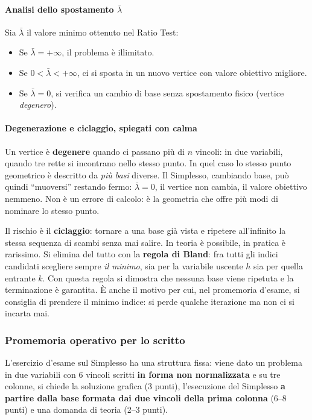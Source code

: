 \documentclass[12pt]{extarticle} %
\begin{document}
\paragraph{Analisi dello spostamento $\bar{\lambda}$}
Sia $\bar{\lambda}$ il valore minimo ottenuto nel Ratio Test:
\begin{itemize}
    \item Se $\bar{\lambda} = +\infty$, il problema è illimitato.
    \item Se $0 < \bar{\lambda} < +\infty$, ci si sposta in un nuovo vertice con valore obiettivo migliore.
    \item Se $\bar{\lambda} = 0$, si verifica un cambio di base senza spostamento fisico (vertice \textit{degenero}).
\end{itemize}

\paragraph{Degenerazione e ciclaggio, spiegati con calma}
Un vertice è \textbf{degenere} quando ci passano più di $n$ vincoli: in due variabili, quando tre rette si incontrano nello stesso punto. In quel caso lo stesso punto geometrico è descritto da \emph{più basi} diverse. Il Simplesso, cambiando base, può quindi ``muoversi'' restando fermo: $\bar{\lambda} = 0$, il vertice non cambia, il valore obiettivo nemmeno. Non è un errore di calcolo: è la geometria che offre più modi di nominare lo stesso punto.

\noindent Il rischio è il \textbf{ciclaggio}: tornare a una base già vista e ripetere all'infinito la stessa sequenza di scambi senza mai salire. In teoria è possibile, in pratica è rarissimo. Si elimina del tutto con la \textbf{regola di Bland}: fra tutti gli indici candidati scegliere sempre \emph{il minimo}, sia per la variabile uscente $h$ sia per quella entrante $k$. Con questa regola si dimostra che nessuna base viene ripetuta e la terminazione è garantita. È anche il motivo per cui, nel promemoria d'esame, si consiglia di prendere il minimo indice: si perde qualche iterazione ma non ci si incarta mai.

\subsubsection{Promemoria operativo per lo scritto}
L'esercizio d'esame sul Simplesso ha una struttura fissa: viene dato un problema in due variabili con 6 vincoli scritti \textbf{in forma non normalizzata} e su tre colonne, si chiede la soluzione grafica (3 punti), l'esecuzione del Simplesso \textbf{a partire dalla base formata dai due vincoli della prima colonna} (6--8 punti) e una domanda di teoria (2--3 punti).
\end{document}
